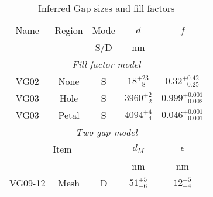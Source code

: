 \begin{table}[h!]
\caption{Inferred Gap sizes and fill factors \label{tbl_DerivedGapSizes}}
\begin{center}
    \begin{tabular}{ c c c c c }
    \hline
    Name & Region & Mode & $d$  &  $f$ \\ 
    -  & - & S/D & nm & - \\
    \hline
    \multicolumn{5}{c}{\emph{Fill factor model}} \\
    \cline{4-5}
    VG02 & None    &   S  & $18^{+23}_{-8}$ & $0.32^{+0.42}_{-0.25}$\\
    VG03 & Hole    &   S  & $3960^{+2}_{-2}$ &  $0.999^{+0.001}_{-0.002}$\\
    VG03 & Petal   &   S  & $4094^{+4}_{-4}$ &  $0.046^{+0.001}_{-0.001}$\\
    \hline
    \multicolumn{5}{c}{\emph{Two gap model}} \\
    \cline{4-5}
    \multicolumn{3}{c}{Item} & $d_M$ & $\epsilon$ \\
    \multicolumn{3}{c}{} & nm    & nm \\
    VG09-12 & Mesh    &   D & $51^{+5}_{-6}  $ &  $12^{+5}_{-4}$\\
    \hline
    \end{tabular}
\end{center}
\end{table}